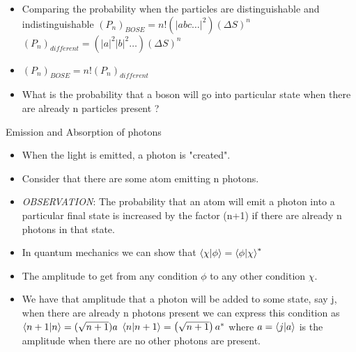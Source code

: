 \documentclass[aspectratio=169]{beamer}
\begin{document}
\begin{frame}
	\begin{itemize}
	\item Comparing the probability when the particles are distinguishable and indistinguishable \pause \newline
	$(P_{n})_{BOSE} = n!\left(\rvert abc\ldots \rvert^{2}\right)(\Delta S)^{n}$ \pause \newline
	$(P_{n})_{different} = \left(\rvert a \rvert^{2}\rvert b \rvert^{2}\ldots\right)(\Delta S)^{n}$ 
	\item $(P_{n})_{BOSE} = n!(P_{n})_{different}$
	\end{itemize}
\end{frame}

\begin{frame}
	\begin{itemize}
		\item What is the probability that a boson will go into particular state when there are already n particles present ?
	\end{itemize}
\end{frame}

\begin{frame}{Emission and Absorption of photons}
	\begin{itemize}
		\item When the light is emitted, a photon is "created".\pause \newline
		\item Consider that there are some atom emitting n photons. \pause \newline
		\item \textit{OBSERVATION}: The probability that an atom will emit a photon into a particular final state is increased by the factor (n+1) if there are already n photons in that state.
	\end{itemize}
\end{frame}

\begin{frame}
	\begin{itemize}
		\item In quantum mechanics we can show that \pause \newline 
		$\braket{\chi|\phi} = \braket{\phi|\chi}^{*}$ \pause \newline
		\item The amplitude to get from any condition $\phi$ to any other condition $\chi$. \pause \newline
		\item We have that amplitude that a photon will be added to some state, say j, when there are already n photons present we can express this condition as \pause \newline
		$\braket{n+1|n}=(\sqrt{n+1})a$\pause \newline
		$\braket{n|n+1}=\left(\sqrt{n+1}\right)a^{*}$ \pause \newline
		where $a = \braket{j|a}$ is the amplitude when there are no other photons are present.
	
	\end{itemize}
\end{frame}
\end{document}
